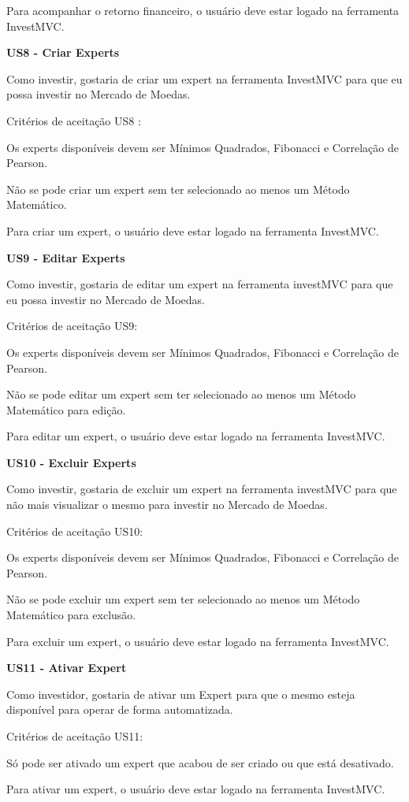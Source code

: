 Para acompanhar o retorno financeiro, o usuário deve estar logado na ferramenta InvestMVC.

\textbf{US8 - Criar Experts}

Como investir, gostaria de criar um expert na ferramenta InvestMVC para que eu possa investir no Mercado de Moedas.

Critérios de aceitação US8 :

Os experts disponíveis devem ser Mínimos Quadrados, Fibonacci e Correlação de Pearson.

Não se pode criar um expert sem ter selecionado ao menos um Método Matemático.

Para criar um expert, o usuário deve estar logado na ferramenta InvestMVC.

\textbf{US9 - Editar Experts}

Como investir, gostaria de editar um expert na ferramenta investMVC para que eu possa investir no Mercado de Moedas.

Critérios de aceitação US9: 

Os experts disponíveis devem ser Mínimos Quadrados, Fibonacci e Correlação de Pearson.

Não se pode editar um expert sem ter selecionado ao menos um Método Matemático para edição.

Para editar um expert, o usuário deve estar logado na ferramenta InvestMVC.


\textbf{US10 - Excluir Experts}

Como investir, gostaria de excluir um expert na ferramenta investMVC para que não mais visualizar o mesmo para investir no Mercado de Moedas.

Critérios de aceitação US10:

Os experts disponíveis devem ser Mínimos Quadrados, Fibonacci e Correlação de Pearson.

Não se pode excluir um expert sem ter selecionado ao menos um Método Matemático para exclusão.

Para excluir um expert, o usuário deve estar logado na ferramenta InvestMVC.


\textbf{US11 - Ativar Expert}

Como investidor, gostaria de ativar um Expert para que o mesmo esteja disponível para operar de forma automatizada.

Critérios de aceitação US11:

Só pode ser ativado um expert que acabou de ser criado ou que está desativado.

Para ativar um expert, o usuário deve estar logado na ferramenta InvestMVC.


